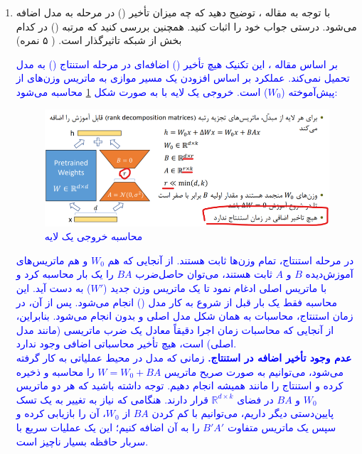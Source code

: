 \documentclass[12pt]{article}
\begin{document}
\begin{enumerate}
\begin{enumerate}
        \item با توجه به مقاله ، توضیح دهید که چه میزان تأخیر () در مرحله  به مدل اضافه می‌شود. درستی جواب خود را اثبات کنید. همچنین بررسی کنید که مرتبه () در کدام بخش از شبکه تاثیرگذار است. ( ۵ نمره)

        \textcolor{blue}{
        بر اساس مقاله ، این تکنیک هیچ تأخیر () اضافه‌ای در مرحله استنتاج () به مدل تحمیل نمی‌کند. عملکرد  بر اساس افزودن یک مسیر موازی به ماتریس وزن‌های از پیش‌آموخته ($W_0$) است. خروجی یک لایه با  به صورت شکل \ref{fig:q2_3} محاسبه می‌شود:\\
      
        \begin{figure}[ht]
            \centering
            \includegraphics[width=\linewidth]{figs/image.png}
            \caption{محاسبه خروجی یک لایه }
            \label{fig:q2_3}
        \end{figure}
        در مرحله استنتاج، تمام وزن‌ها ثابت هستند. از آنجایی که هم $W_0$ و هم ماتریس‌های آموزش‌دیده $B$ و $A$ ثابت هستند، می‌توان حاصل‌ضرب $BA$ را یک بار محاسبه کرد و با ماتریس اصلی ادغام نمود تا یک ماتریس وزن جدید ($W'$) به دست آید. این محاسبه فقط یک بار قبل از شروع به کار مدل () انجام می‌شود. پس از آن، در زمان استنتاج، محاسبات به همان شکل مدل اصلی و بدون  انجام می‌شود. بنابراین، از آنجایی که محاسبات زمان اجرا دقیقاً معادل یک ضرب ماتریسی (مانند مدل اصلی) است، هیچ تأخیر محاسباتی اضافی وجود ندارد.\\
        \textbf{عدم وجود تأخیر اضافه در استنتاج.} زمانی که مدل در محیط عملیاتی به کار گرفته می‌شود، می‌توانیم به صورت صریح ماتریس $W = W_0 + BA$ را محاسبه و ذخیره کرده و استنتاج را مانند همیشه انجام دهیم. توجه داشته باشید که هر دو ماتریس $W_0$ و $BA$ در فضای $\mathbb{R}^{d \times k}$ قرار دارند. هنگامی که نیاز به تغییر به یک تسک پایین‌دستی دیگر داریم، می‌توانیم با کم کردن $BA$ از $W_0$، آن را بازیابی کرده و سپس یک ماتریس متفاوت $B'A'$ را به آن اضافه کنیم؛ این یک عملیات سریع با سربار حافظه بسیار ناچیز است.\\
}
\end{enumerate}
\end{enumerate}
\end{document}
